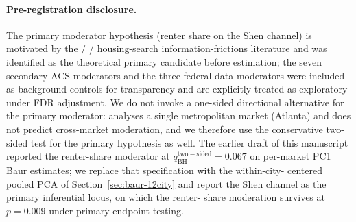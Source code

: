 \paragraph{Pre-registration disclosure.} The primary moderator
hypothesis (renter share on the Shen channel) is motivated by the
\citet{stigler1961economics} / \citet{genesove1997equity} / \citet{anenberg2020housing}
housing-search information-frictions literature and was identified
as the theoretical primary candidate before estimation; the seven
secondary ACS moderators and the three federal-data moderators were
included as background controls for transparency and are explicitly
treated as exploratory under FDR adjustment.  We do not invoke a one-sided directional
alternative for the primary moderator: \citet{shen2021information}
analyses a single metropolitan market (Atlanta) and does not predict
cross-market moderation, and we therefore use the conservative two-
sided test for the primary hypothesis as well.  The earlier draft of
this manuscript reported the renter-share moderator at
$q_{\mathrm{BH}}^{\mathrm{two-sided}} = 0.067$ on per-market PC1 Baur
estimates; we replace that specification with the within-city-
centered pooled PCA of Section~\ref{sec:baur-12city} and report the
Shen channel as the primary inferential locus, on which the renter-
share moderation survives at $p = 0.009$ under primary-endpoint
testing.
